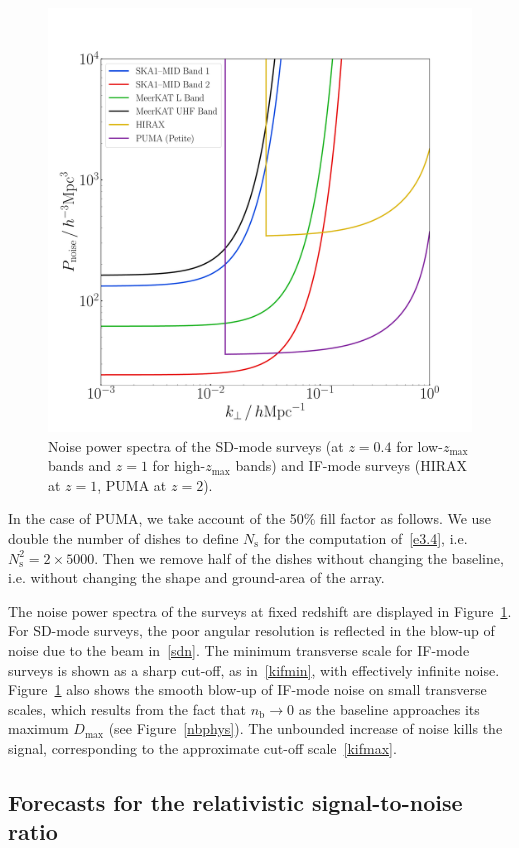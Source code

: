 \begin{figure}[!ht]
\centering
\includegraphics[width=.49\textwidth]{fig/Pnoise}
\vspace*{-0.5cm}
\caption{Noise power spectra of the SD-mode surveys (at $z=0.4$ for low-$z_\mathrm{max}$ bands and $z=1$ for high-$z_\mathrm{max}$ bands) and IF-mode surveys (HIRAX at $z=1$, PUMA at $z=2$).}\label{pnoise}
\end{figure}

In the case of PUMA, we take account of the 50\% fill factor as follows. We use double the number of dishes to define $N_\mathrm{s}$ for the computation of~\eqref{e3.4}, i.e. $N_\mathrm{s}^2= 2\times 5000$. Then  we  remove half of the dishes without changing the baseline, i.e. without changing the shape and ground-area of the array.

The noise power spectra of the surveys at fixed redshift are displayed in Figure~\ref{pnoise}. For SD-mode surveys, the poor angular resolution is reflected in the blow-up of noise due to the beam in~\eqref{sdn}.
The minimum transverse scale for IF-mode surveys  is shown as a sharp cut-off, as in~\eqref{kifmin}, with effectively infinite noise.
Figure~\ref{pnoise} also shows the smooth blow-up of IF-mode noise on small transverse scales, which results  from the fact that 
$n_\mathrm{b}\to 0$ as the baseline approaches its maximum $D_\mathrm{max}$ (see Figure~\ref{nbphys}). The unbounded increase of noise kills the signal, corresponding to the approximate cut-off scale~\eqref{kifmax}.

\subsection{Forecasts for the relativistic signal-to-noise ratio}
